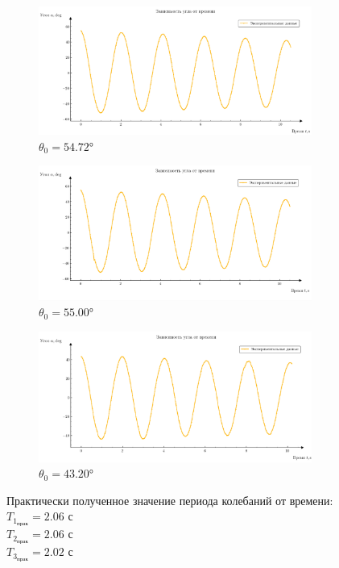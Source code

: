 \documentclass{report}
\begin{document}
\begin{enumerate}
\begin{figure}[H]
    \begin{center}
    \includegraphics[width=0.8\textwidth]{4.png}
    \caption{$\theta_0 = \ang{54.72}$}
\end{center}
\end{figure}
\begin{figure}[H]
    \begin{center}
    \includegraphics[width=0.8\textwidth]{5.png}
    \caption{$\theta_0 = \ang{55.00}$}
\end{center}
\end{figure}
\begin{figure}[H]
    \begin{center}
    \includegraphics[width=0.8\textwidth]{6.png}
    \caption{$\theta_0 = \ang{43.20}$}
\end{center}
\end{figure}



Практически полученное значение периода колебаний от времени:
\\
$T_{1_{\text{прак}}} = 2.06 \text{ с}$
\\
$T_{2_{\text{прак}}} = 2.06 \text{ с}$
\\
$T_{3_{\text{прак}}} = 2.02 \text{ с}$


\end{enumerate}
\end{document}

